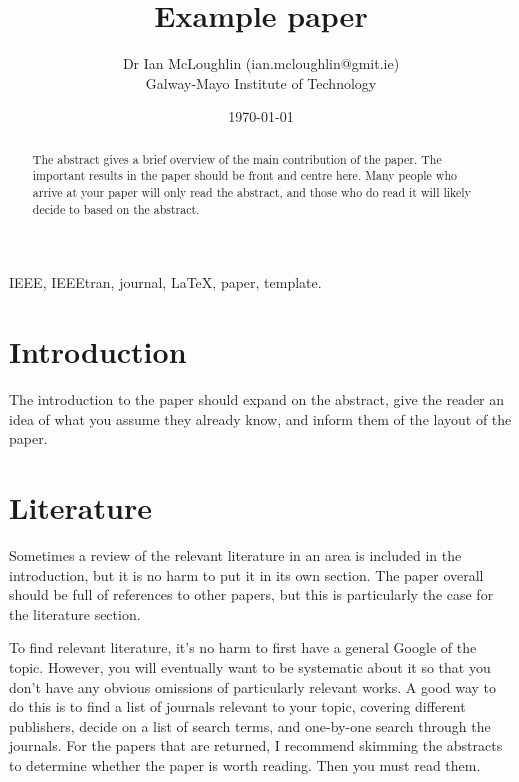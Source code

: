 \documentclass[journal]{IEEEtran}
\begin{document}
\title{Example paper}

\author{Dr Ian McLoughlin (ian.mcloughlin@gmit.ie) \\ Galway-Mayo Institute of Technology}
\date{\today}

\maketitle


\begin{abstract}
  The abstract gives a brief overview of the main contribution of the paper.
  The important results in the paper should be front and centre here.
  Many people who arrive at your paper will only read the abstract, and those
  who do read it will likely decide to based on the abstract.
\end{abstract}

\begin{IEEEkeywords}
  IEEE, IEEEtran, journal, \LaTeX, paper, template.
\end{IEEEkeywords}


\section{Introduction}
  The introduction to the paper should expand on the abstract, give the reader
  an idea of what you assume they already know, and inform them of the layout of
  the paper.

\section{Literature}
  Sometimes a review of the relevant literature in an area is included in the
  introduction, but it is no harm to put it in its own section. The paper
  overall should be full of references to other papers, but this is particularly
  the case for the literature section.
  
  To find relevant literature, it's no harm to first have a general Google of
  the topic. However, you will eventually want to be systematic about it so
  that you don't have any obvious omissions of particularly relevant works.
  A good way to do this is to find a list of journals relevant to your topic,
  covering different publishers, decide on a list of search terms, and 
  one-by-one search through the journals. For the papers that are returned,
  I recommend skimming the abstracts to determine whether the paper is worth
  reading. Then you must read them.
\end{document}
